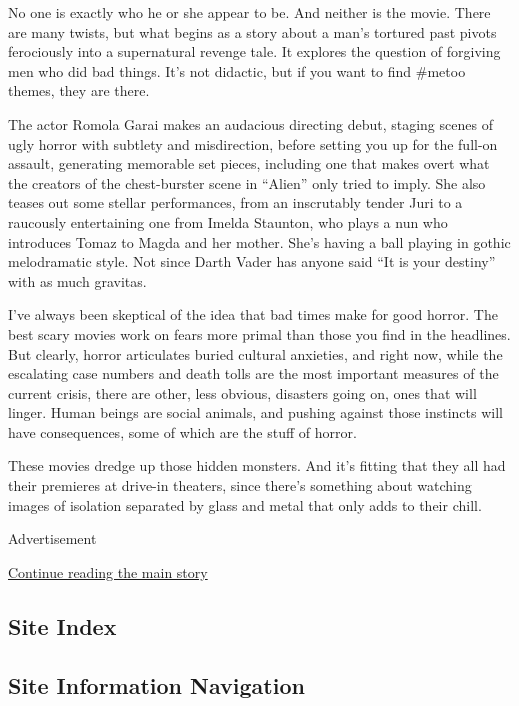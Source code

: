 No one is exactly who he or she appear to be. And neither is the movie.
There are many twists, but what begins as a story about a man's tortured
past pivots ferociously into a supernatural revenge tale. It explores
the question of forgiving men who did bad things. It's not didactic, but
if you want to find \#metoo themes, they are there.

The actor Romola Garai makes an audacious directing debut, staging
scenes of ugly horror with subtlety and misdirection, before setting you
up for the full-on assault, generating memorable set pieces, including
one that makes overt what the creators of the chest-burster scene in
``Alien'' only tried to imply. She also teases out some stellar
performances, from an inscrutably tender Juri to a raucously
entertaining one from Imelda Staunton, who plays a nun who introduces
Tomaz to Magda and her mother. She's having a ball playing in gothic
melodramatic style. Not since Darth Vader has anyone said ``It is your
destiny'' with as much gravitas.

I've always been skeptical of the idea that bad times make for good
horror. The best scary movies work on fears more primal than those you
find in the headlines. But clearly, horror articulates buried cultural
anxieties, and right now, while the escalating case numbers and death
tolls are the most important measures of the current crisis, there are
other, less obvious, disasters going on, ones that will linger. Human
beings are social animals, and pushing against those instincts will have
consequences, some of which are the stuff of horror.

These movies dredge up those hidden monsters. And it's fitting that they
all had their premieres at drive-in theaters, since there's something
about watching images of isolation separated by glass and metal that
only adds to their chill.

Advertisement

\protect\hyperlink{after-bottom}{Continue reading the main story}

\hypertarget{site-index}{%
\subsection{Site Index}\label{site-index}}

\hypertarget{site-information-navigation}{%
\subsection{Site Information
Navigation}\label{site-information-navigation}}

